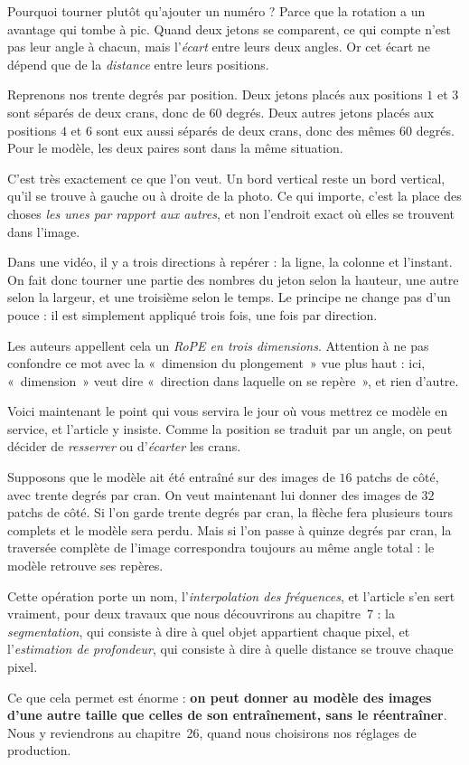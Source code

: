 Pourquoi tourner plutôt qu'ajouter un numéro ? Parce que la rotation a un
avantage qui tombe à pic. Quand deux jetons se comparent, ce qui compte
n'est pas leur angle à chacun, mais l'\emph{écart} entre leurs deux angles.
Or cet écart ne dépend que de la \emph{distance} entre leurs positions.

\begin{exemple}
Reprenons nos trente degrés par position. Deux jetons placés aux positions
$1$ et $3$ sont séparés de deux crans, donc de $60$ degrés. Deux autres
jetons placés aux positions $4$ et $6$ sont eux aussi séparés de deux crans,
donc des mêmes $60$ degrés. Pour le modèle, les deux paires sont dans la
même situation.

C'est très exactement ce que l'on veut. Un bord vertical reste un bord
vertical, qu'il se trouve à gauche ou à droite de la photo. Ce qui importe,
c'est la place des choses \emph{les unes par rapport aux autres}, et non
l'endroit exact où elles se trouvent dans l'image.
\end{exemple}

Dans une vidéo, il y a trois directions à repérer : la ligne, la colonne et
l'instant. On fait donc tourner une partie des nombres du jeton selon la
hauteur, une autre selon la largeur, et une troisième selon le temps. Le
principe ne change pas d'un pouce : il est simplement appliqué trois fois,
une fois par direction.

Les auteurs appellent cela un \emph{RoPE en trois dimensions}. Attention à
ne pas confondre ce mot avec la «~dimension du plongement~» vue plus haut :
ici, «~dimension~» veut dire «~direction dans laquelle on se repère~», et
rien d'autre.

\begin{enia}
Voici maintenant le point qui vous servira le jour où vous mettrez ce modèle
en service, et l'article y insiste. Comme la position se traduit par un
angle, on peut décider de \emph{resserrer} ou d'\emph{écarter} les crans.

Supposons que le modèle ait été entraîné sur des images de $16$ patchs de
côté, avec trente degrés par cran. On veut maintenant lui donner des images
de $32$ patchs de côté. Si l'on garde trente degrés par cran, la flèche fera
plusieurs tours complets et le modèle sera perdu. Mais si l'on passe à
quinze degrés par cran, la traversée complète de l'image correspondra
toujours au même angle total : le modèle retrouve ses repères.

Cette opération porte un nom, l'\emph{interpolation des fréquences}, et
l'article s'en sert vraiment, pour deux travaux que nous découvrirons au
chapitre~7 : la \emph{segmentation}, qui consiste à dire à quel objet
appartient chaque pixel, et l'\emph{estimation de profondeur}, qui consiste
à dire à quelle distance se trouve chaque pixel.

Ce que cela permet est énorme : \textbf{on peut donner au modèle des images
d'une autre taille que celles de son entraînement, sans le réentraîner}.
Nous y reviendrons au chapitre~26, quand nous choisirons nos réglages de
production.
\end{enia}

